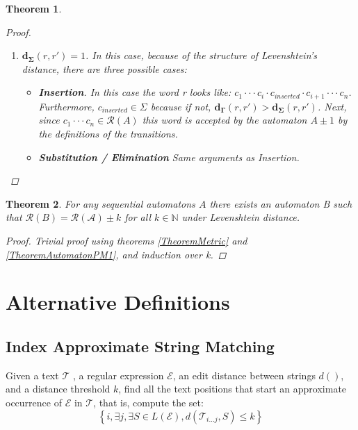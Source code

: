 \documentclass{article}
\newcommand{\set}[1]{\left\{#1\right\}}
\newtheorem{theorem}{Theorem}
\begin{document}
\begin{theorem}
\begin{proof}
\begin{enumerate}
            \item $\mathbf{d_\Sigma}(r, r') = 1$. In this case,
            because of the structure of Levenshtein's distance,
            there are three possible cases:

            \begin{itemize}
                \item \textbf{Insertion}. In this case the word r looks like:
                    $c_1 \cdot\cdot\cdot c_i \cdot c_{inserted} \cdot c_{i + 1} \cdot\cdot\cdot c_n$. Furthermore, $c_{inserted} \in \Sigma$ because if not, $\mathbf{d_\Gamma}(r,r') > \mathbf{d_\Sigma}(r,r')$. Next, since $c_1\cdot\cdot\cdot c_n \in \mathcal{R}(A)$ this word is accepted by the automaton $A\pm1$ by the definitions of the transitions.
                \item \textbf{Substitution / Elimination} Same arguments as Insertion.
            \end{itemize}
        \end{enumerate}
    \end{proof}
\end{theorem}

\begin{theorem}
    For any sequential automatons $A$ there exists an automaton B such that $\mathcal{R}(B) = \mathcal{R(A)} \pm k$ for all $k\in \mathbb{N}$ under Levenshtein distance.
    \begin{proof}
        Trivial proof using theorems \ref{TheoremMetric} and \ref{TheoremAutomatonPM1}, and induction over k.
    \end{proof}
\end{theorem}


\section{Alternative Definitions}

\subsection{Index Approximate String Matching}

Given a text $\mathcal{T}$ , a regular expression $\mathcal{E}$,
an edit distance between strings $d()$, and a distance threshold
$k$, find all the text positions that start an approximate occurrence
of $\mathcal{E}$ in $\mathcal{T}$, that is, compute the set:
\begin{equation*}
    \set{i, \exists j, \exists S \in L(\mathcal{E}), d(\mathcal{T}_{i...j} , S) \leq k}
\end{equation*}
\end{document}
